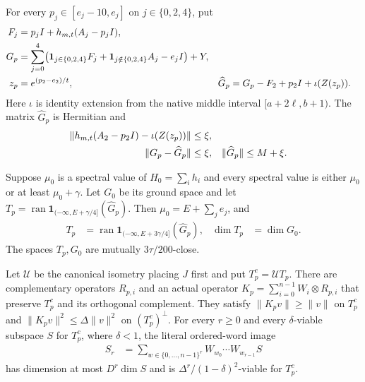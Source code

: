 \begin{theorem}
    For every $p_j\in[e_j-10,e_j]$ on $j\in\{0,2,4\}$, put
    \begin{align}
        F_j          & =p_jI+h_{m,t}(A_j-p_jI),\notag      \\
        G_p          & =\sum_{j=0}^4
        \bigl(\mathbf1_{j\in\{0,2,4\}}F_j+
        \mathbf1_{j\notin\{0,2,4\}}A_j-e_jI\bigr)+Y,\notag \\
        z_p          & =e^{(p_2-e_2)/t},              &
        \widehat G_p & =G_p-F_2+p_2I+\iota(Z(z_p)).
        \label{eq:uniform_soft_same_approximant}
    \end{align}
    Here $\iota$ is identity extension from the native middle interval
    $[a+2\ell,b+1)$. The matrix $\widehat G_p$ is Hermitian and
    \begin{align}
        \|h_{m,t}(A_2-p_2I)-\iota(Z(z_p))\| & \le\xi,\notag   \\
        \|G_p-\widehat G_p\|                & \le\xi,       &
        \|\widehat G_p\|                    & \le M+\xi.
        \label{eq:uniform_soft_same_error}
    \end{align}

    Suppose $\mu_0$ is a spectral value of $H_0=\sum_i h_i$ and every
    spectral value is either $\mu_0$ or at least $\mu_0+\gamma$.
    Let $G_0$ be its ground space and let
    $T_p=\operatorname{ran}\mathbf1_{(-\infty,E+\gamma/4]}(\widehat G_p)$.
    Then $\mu_0=E+\sum_j e_j$, and
    \begin{align}
        T_p                                             & =\operatorname{ran}
        \mathbf1_{(-\infty,E+3\gamma/4]}(\widehat G_p), &
        \dim T_p                                        & =\dim G_0.
        \label{eq:uniform_soft_own_cluster}
    \end{align}
    The spaces $T_p,G_0$ are mutually $3\tau/200$-close.

    Let $\mathcal U$ be the canonical isometry placing $J$ first and
    put $T_p^c=\mathcal U T_p$. There are complementary operators
    $R_{p,i}$ and an actual operator
    $K_p=\sum_{i=0}^{n-1}W_i\otimes R_{p,i}$ that preserve
    $T_p^c$ and its orthogonal complement. They satisfy
    $\|K_pv\|\ge\|v\|$ on $T_p^c$ and
    $\|K_pv\|^2\le\Delta\|v\|^2$ on $(T_p^c)^\perp$.
    For every $r\ge0$ and every $\delta$-viable subspace $S$ for
    $T_p^c$, where $\delta<1$, the literal ordered-word image
    \begin{align}
        S_r & =\sum_{w\in\{0,\ldots,n-1\}^r}
        W_{w_0}\cdots W_{w_{r-1}}S
        \label{eq:uniform_soft_word_image}
    \end{align}
    has dimension at most $D^r\dim S$ and is
    $\Delta^r/(1-\delta)^2$-viable for $T_p^c$.
\end{theorem}
